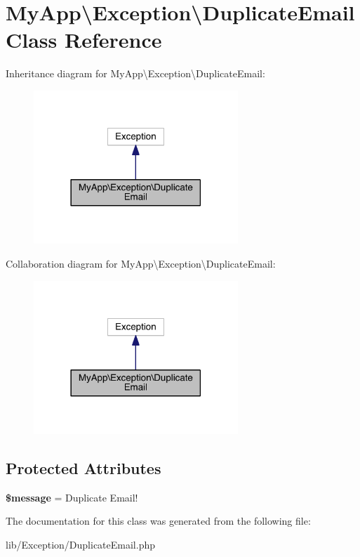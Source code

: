 \hypertarget{class_my_app_1_1_exception_1_1_duplicate_email}{}\section{My\+App\textbackslash{}Exception\textbackslash{}Duplicate\+Email Class Reference}
\label{class_my_app_1_1_exception_1_1_duplicate_email}


Inheritance diagram for My\+App\textbackslash{}Exception\textbackslash{}Duplicate\+Email\+:
\nopagebreak
\begin{figure}[H]
\begin{center}
\leavevmode
\includegraphics[width=218pt]{class_my_app_1_1_exception_1_1_duplicate_email__inherit__graph}
\end{center}
\end{figure}


Collaboration diagram for My\+App\textbackslash{}Exception\textbackslash{}Duplicate\+Email\+:
\nopagebreak
\begin{figure}[H]
\begin{center}
\leavevmode
\includegraphics[width=218pt]{class_my_app_1_1_exception_1_1_duplicate_email__coll__graph}
\end{center}
\end{figure}
\subsection*{Protected Attributes}
\begin{DoxyCompactItemize}
\item 
{\bfseries \$message} = \textquotesingle{}Duplicate Email!\textquotesingle{}\hypertarget{class_my_app_1_1_exception_1_1_duplicate_email_aefe80876a9c577da6cc4653308b244a5}{}\label{class_my_app_1_1_exception_1_1_duplicate_email_aefe80876a9c577da6cc4653308b244a5}

\end{DoxyCompactItemize}


The documentation for this class was generated from the following file\+:\begin{DoxyCompactItemize}
\item 
lib/\+Exception/Duplicate\+Email.\+php\end{DoxyCompactItemize}
